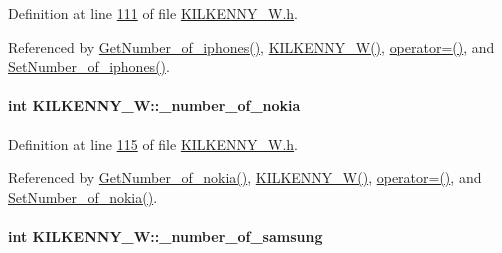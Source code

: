 Definition at line \hyperlink{_k_i_l_k_e_n_n_y___w_8h_source_l00111}{111} of file \hyperlink{_k_i_l_k_e_n_n_y___w_8h_source}{K\+I\+L\+K\+E\+N\+N\+Y\+\_\+\+W.\+h}.



Referenced by \hyperlink{_k_i_l_k_e_n_n_y___w_8cpp_source_l00113}{Get\+Number\+\_\+of\+\_\+iphones()}, \hyperlink{_k_i_l_k_e_n_n_y___w_8h_source_l00024}{K\+I\+L\+K\+E\+N\+N\+Y\+\_\+\+W()}, \hyperlink{_k_i_l_k_e_n_n_y___w_8h_source_l00075}{operator=()}, and \hyperlink{_k_i_l_k_e_n_n_y___w_8cpp_source_l00109}{Set\+Number\+\_\+of\+\_\+iphones()}.

\paragraph[{\texorpdfstring{\+\_\+number\+\_\+of\+\_\+nokia}{_number_of_nokia}}]{\setlength{\rightskip}{0pt plus 5cm}int K\+I\+L\+K\+E\+N\+N\+Y\+\_\+\+W\+::\+\_\+number\+\_\+of\+\_\+nokia\hspace{0.3cm}{\ttfamily [private]}}\hypertarget{class_k_i_l_k_e_n_n_y___w_a717b79aedec8f4f76269fc0e83bcd2eb_a717b79aedec8f4f76269fc0e83bcd2eb}{}\label{class_k_i_l_k_e_n_n_y___w_a717b79aedec8f4f76269fc0e83bcd2eb_a717b79aedec8f4f76269fc0e83bcd2eb}


Definition at line \hyperlink{_k_i_l_k_e_n_n_y___w_8h_source_l00115}{115} of file \hyperlink{_k_i_l_k_e_n_n_y___w_8h_source}{K\+I\+L\+K\+E\+N\+N\+Y\+\_\+\+W.\+h}.



Referenced by \hyperlink{_k_i_l_k_e_n_n_y___w_8cpp_source_l00081}{Get\+Number\+\_\+of\+\_\+nokia()}, \hyperlink{_k_i_l_k_e_n_n_y___w_8h_source_l00024}{K\+I\+L\+K\+E\+N\+N\+Y\+\_\+\+W()}, \hyperlink{_k_i_l_k_e_n_n_y___w_8h_source_l00075}{operator=()}, and \hyperlink{_k_i_l_k_e_n_n_y___w_8cpp_source_l00077}{Set\+Number\+\_\+of\+\_\+nokia()}.

\paragraph[{\texorpdfstring{\+\_\+number\+\_\+of\+\_\+samsung}{_number_of_samsung}}]{\setlength{\rightskip}{0pt plus 5cm}int K\+I\+L\+K\+E\+N\+N\+Y\+\_\+\+W\+::\+\_\+number\+\_\+of\+\_\+samsung\hspace{0.3cm}{\ttfamily [private]}}\hypertarget{class_k_i_l_k_e_n_n_y___w_abf89dc9f1d933e77c3597d2835c692a0_abf89dc9f1d933e77c3597d2835c692a0}{}\label{class_k_i_l_k_e_n_n_y___w_abf89dc9f1d933e77c3597d2835c692a0_abf89dc9f1d933e77c3597d2835c692a0}


